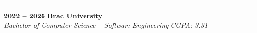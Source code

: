 
\\
\color{textSecond}\noindent\rule{\linewidth}{2pt}
\stdGap

\color{textBlack}
\noindent\textbf{2022 -- 2026} \hfill \textbf{Brac University} \\
\textit{Bachelor of Computer Science -- Software Engineering} \hfill \textit{CGPA: 3.31} \\

